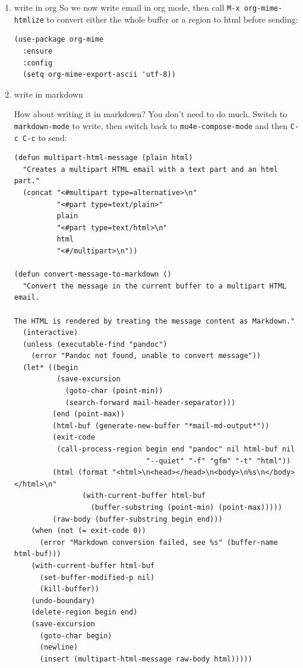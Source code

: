 \documentclass[11pt]{article}
\begin{document}
\begin{enumerate}
\item write in org
\label{sec:org51232d6}
So we now write email in org mode, then call \texttt{M-x org-mime-htmlize} to
convert either the whole buffer or a region to html before sending:

\begin{verbatim}
(use-package org-mime
  :ensure
  :config
  (setq org-mime-export-ascii 'utf-8))
\end{verbatim}

\item write in markdown
\label{sec:org126c982}

How about writing it in markdown? You don't need to do much. Switch to
\texttt{markdown-mode} to write, then switch back to \texttt{mu4e-compose-mode} and
then \texttt{C-c C-c} to send:

\begin{verbatim}
(defun multipart-html-message (plain html)
  "Creates a multipart HTML email with a text part and an html part."
  (concat "<#multipart type=alternative>\n"
          "<#part type=text/plain>"
          plain
          "<#part type=text/html>\n"
          html
          "<#/multipart>\n"))

(defun convert-message-to-markdown ()
  "Convert the message in the current buffer to a multipart HTML email.

The HTML is rendered by treating the message content as Markdown."
  (interactive)
  (unless (executable-find "pandoc")
    (error "Pandoc not found, unable to convert message"))
  (let* ((begin
          (save-excursion
            (goto-char (point-min))
            (search-forward mail-header-separator)))
         (end (point-max))
         (html-buf (generate-new-buffer "*mail-md-output*"))
         (exit-code
          (call-process-region begin end "pandoc" nil html-buf nil
                               "--quiet" "-f" "gfm" "-t" "html"))
         (html (format "<html>\n<head></head>\n<body>\n%s\n</body></html>\n"
                (with-current-buffer html-buf
                  (buffer-substring (point-min) (point-max)))))
         (raw-body (buffer-substring begin end)))
    (when (not (= exit-code 0))
      (error "Markdown conversion failed, see %s" (buffer-name html-buf)))
    (with-current-buffer html-buf
      (set-buffer-modified-p nil)
      (kill-buffer))
    (undo-boundary)
    (delete-region begin end)
    (save-excursion
      (goto-char begin)
      (newline)
      (insert (multipart-html-message raw-body html)))))


\end{verbatim}
\end{enumerate}
\end{document}
